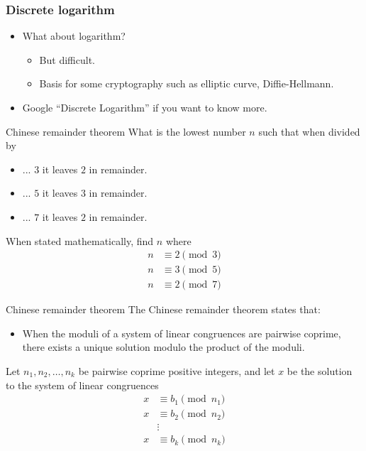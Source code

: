 \documentclass{beamer}
\begin{document}
\begin{frame}[plain]
  \frametitle{Discrete logarithm}
  \vspace{30pt}
  \begin{itemize}
    \item What about logarithm? 
      \begin{itemize}
        \item But difficult.
        \item Basis for some cryptography such as elliptic curve, Diffie-Hellmann.
      \end{itemize}
    \item Google ``Discrete Logarithm'' if you want to know more.
  \end{itemize}
\end{frame}



\begin{frame}[plain]{Chinese remainder theorem}
  \vspace{20pt}
  What is the lowest number $n$ such that when divided by
  \vspace{10pt}
  \begin{itemize}
    \item[] ... $3$ it leaves $2$ in remainder.
    \item[] ... $5$ it leaves $3$ in remainder.
    \item[] ... $7$ it leaves $2$ in remainder.
  \end{itemize}
  \vspace{10pt}
  When stated mathematically, find $n$ where
      \begin{align*}
  n &\equiv 2 \pmod{3} \\
  n &\equiv 3 \pmod{5} \\
  n &\equiv 2 \pmod{7}
      \end{align*}
\end{frame}

\begin{frame}[plain]{Chinese remainder theorem}
  \vspace{20pt}
  The Chinese remainder theorem states that:
  \begin{itemize}
    \item When the moduli of a system of linear congruences are pairwise
      coprime, there exists a unique solution modulo the product of the moduli.
  \end{itemize}
  Let $n_1, n_2,\ldots, n_k$ be pairwise coprime positive integers, and let $x$
  be the solution to the system of linear congruences
  \begin{align*}
    x &\equiv  b_1 \pmod{n_1} \\
    x &\equiv  b_2 \pmod{n_2} \\
      &\vdots                 \\
    x &\equiv b_k \pmod{n_k}
  \end{align*}
\end{frame}
\end{document}
